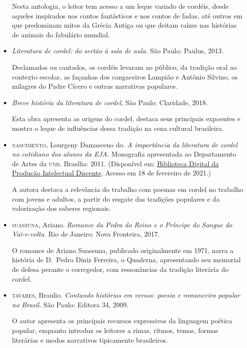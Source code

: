 \documentclass[12pt]{extarticle}
\begin{document}
\begin{itemize}
Nesta antologia, o leitor tem acesso a um leque variado de cordéis,
desde aqueles inspirados nos contos fantásticos e nos contos de fadas,
até outros em que predominam mitos da Grécia Antiga ou que deitam raízes
nas histórias de animais do fabulário mundial.

\item {} \textit{Literatura de cordel: do sertão à sala de
aula.} São Paulo: Paulus, 2013.

Declamados ou cantados, os cordéis levaram ao público, da tradição oral
ao contexto escolar, as façanhas dos cangaceiros Lampião e Antônio
Silvino, os milagres do Padre Cícero e outras narrativas populares.

\item {} \textit{Breve história da literatura de cordel.} São
Paulo: Claridade, 2018.

Esta obra apresenta as origens do cordel, destaca seus principais
expoentes e mostra o leque de influências dessa tradição na cena
cultural brasileira.

\item \textsc{nascimento}, Lourgeny Damasceno do. \textit{A importância da literatura
de cordel no cotidiano dos alunos da EJA}. Monografia apresentada ao
Departamento de Artes da \textsc{unb}. Brasília: 2011. (Disponível em:
\href{https://bdm.unb.br/bitstream/10483/4463/1/2011_LourgenyDamascenodoNascimento.pdf}{Biblioteca Digital da Produção Intelectual Discente}.
Acesso em 18 de fevereiro de 2021.)

A autora destaca a relevância do trabalho com poemas em cordel no
trabalho com jovens e adultos, a partir do resgate das tradições
populares e da valorização dos saberes regionais.

\item \textsc{suassuna}, Ariano. \textit{Romance da Pedra do Reino e o Príncipe do
Sangue do Vai-e-volta}. Rio de Janeiro: Nova Fronteira, 2017.

O romance de Ariano Suassuna, publicado originalmente em 1971, narra a
história de D.~Pedro Diniz Ferreira, o Quaderna, apresentando seu
memorial de defesa perante o corregedor, com ressonâncias da tradição
literária do cordel.

\item \textsc{tavares}, Braulio. \textit{Contando histórias em versos: poesia e
romanceiro popular no Brasil.} São Paulo: Editora 34, 2009.

O autor apresenta os principais recursos expressivos da linguagem
poética popular, enquanto introduz os leitores a rimas, ritmos, temas,
formas literárias e modos narrativos tipicamente brasileiros.


\end{itemize}
\end{document}
